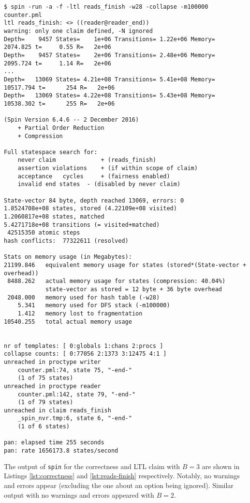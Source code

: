 \documentclass[a4paper]{scrartcl}
\begin{document}
\begin{lstlisting}[float, caption = {\texttt{spin} output for checking the LTL claim \texttt{reads\_finish} with \(B = 3\)}, label = lst:reads-finish]
$ spin -run -a -f -ltl reads_finish -w28 -collapse -m100000 counter.pml
ltl reads_finish: <> ((reader@reader_end))
warning: only one claim defined, -N ignored
Depth=    9457 States=    1e+06 Transitions= 1.22e+06 Memory=  2074.825	t=     0.55 R=   2e+06
Depth=    9457 States=    2e+06 Transitions= 2.48e+06 Memory=  2095.724	t=     1.14 R=   2e+06
...
Depth=   13069 States= 4.21e+08 Transitions= 5.41e+08 Memory= 10517.794	t=      254 R=   2e+06
Depth=   13069 States= 4.22e+08 Transitions= 5.43e+08 Memory= 10538.302	t=      255 R=   2e+06

(Spin Version 6.4.6 -- 2 December 2016)
	+ Partial Order Reduction
	+ Compression

Full statespace search for:
	never claim         	+ (reads_finish)
	assertion violations	+ (if within scope of claim)
	acceptance   cycles 	+ (fairness enabled)
	invalid end states	- (disabled by never claim)

State-vector 84 byte, depth reached 13069, errors: 0
1.8524708e+08 states, stored (4.22109e+08 visited)
1.2060817e+08 states, matched
5.4271718e+08 transitions (= visited+matched)
 42515350 atomic steps
hash conflicts:  77322611 (resolved)

Stats on memory usage (in Megabytes):
21199.846	equivalent memory usage for states (stored*(State-vector + overhead))
 8488.262	actual memory usage for states (compression: 40.04%)
         	state-vector as stored = 12 byte + 36 byte overhead
 2048.000	memory used for hash table (-w28)
    5.341	memory used for DFS stack (-m100000)
    1.412	memory lost to fragmentation
10540.255	total actual memory usage


nr of templates: [ 0:globals 1:chans 2:procs ]
collapse counts: [ 0:77056 2:1373 3:12475 4:1 ]
unreached in proctype writer
	counter.pml:74, state 75, "-end-"
	(1 of 75 states)
unreached in proctype reader
	counter.pml:142, state 79, "-end-"
	(1 of 79 states)
unreached in claim reads_finish
	_spin_nvr.tmp:6, state 6, "-end-"
	(1 of 6 states)

pan: elapsed time 255 seconds
pan: rate 1656173.8 states/second
\end{lstlisting}

The output of \texttt{spin} for the correctness and LTL claim with \(B = 3\) are shown in Listings \ref{lst:correctness} and \ref{lst:reads-finish} respectively. Notably, no warnings and errors appear (excluding the one about an option being ignored). Similar output with no warnings and errors appeared with \(B = 2\).
\end{document}
